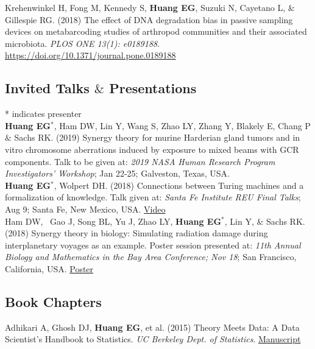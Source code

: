 \documentclass[10pt, letterpaper]{article}
\newcommand{\years}[1]{\marginnote{\scriptsize #1}}
\begin{document}
\years{2018}Krehenwinkel H, Fong M, Kennedy S, \textbf{Huang EG}, Suzuki N, Cayetano L, \& Gillespie RG. (2018) The effect of DNA degradation bias in passive sampling devices on metabarcoding studies of arthropod communities and their associated microbiota. \emph{PLOS ONE 13(1): e0189188}. \\
\href{https://doi.org/10.1371/journal.pone.0189188}{https://doi.org/10.1371/journal.pone.0189188} \\

\subsection*{Invited Talks $\&$ Presentations}
* indicates presenter\\

\noindent
\years{2019}\textbf{Huang EG}$^{*}$, Ham DW, Lin Y, Wang S, Zhao LY, Zhang Y, Blakely E, Chang P $\&$ Sachs RK. (2019) Synergy theory for murine Harderian gland tumors and in vitro chromosome aberrations induced by exposure to mixed beams with GCR components. Talk to be given at: \emph{2019 NASA Human Research Program Investigators' Workshop}; Jan 22-25; Galveston, Texas, USA.\\

\years{2018}\textbf{Huang EG}$^{*}$, Wolpert DH. (2018) Connections between Turing machines and a formalization of knowledge. Talk given at: \emph{Santa Fe Institute REU Final Talks}; Aug 9; Santa Fe, New Mexico, USA. \href{https://www.youtube.com/watch?v=10bi_R47uYw&list=PLZlVBTf7N6GpTwEeQOlOmIfYN5J7zciZR&index=6&t=0s}{Video}\\

\years{2018}Ham DW,  Gao J, Song BL, Yu J, Zhao LY, \textbf{Huang EG}$^{*}$, Lin Y, \& Sachs RK. (2018) Synergy theory in biology: Simulating radiation damage during interplanetary voyages as an example. Poster session presented at: \emph{11th Annual Biology and Mathematics in the Bay Area Conference; Nov 18}; San Francisco, California, USA. \href{https://github.com/sachsURAP/BaMBA_11/blob/master/Bamba17v3.pdf}{Poster}\\

\subsection*{Book Chapters}
\noindent
\years{2015}Adhikari A, Ghosh DJ, \textbf{Huang EG}, et al. (2015) Theory Meets Data: A Data Scientist’s Handbook to Statistics. \emph{UC Berkeley Dept. of Statistics}. {\href{https://github.com/eghuang/stat_94}{Manuscript}}\\
\end{document}
